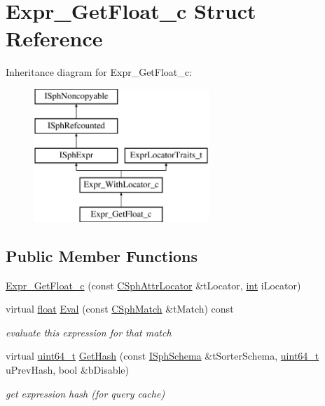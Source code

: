 \hypertarget{structExpr__GetFloat__c}{\section{Expr\-\_\-\-Get\-Float\-\_\-c Struct Reference}
\label{structExpr__GetFloat__c}
}
Inheritance diagram for Expr\-\_\-\-Get\-Float\-\_\-c\-:\begin{figure}[H]
\begin{center}
\leavevmode
\includegraphics[height=5.000000cm]{structExpr__GetFloat__c}
\end{center}
\end{figure}
\subsection*{Public Member Functions}
\begin{DoxyCompactItemize}
\item 
\hyperlink{structExpr__GetFloat__c_a2bade51cf3b9e873dc2a28bccbd918f9}{Expr\-\_\-\-Get\-Float\-\_\-c} (const \hyperlink{structCSphAttrLocator}{C\-Sph\-Attr\-Locator} \&t\-Locator, \hyperlink{sphinxexpr_8cpp_a4a26e8f9cb8b736e0c4cbf4d16de985e}{int} i\-Locator)
\item 
virtual \hyperlink{sphinxexpr_8cpp_a0e0d0739f7035f18f949c2db2c6759ec}{float} \hyperlink{structExpr__GetFloat__c_ad903e9b4bef2fff20ffe7f9d1ff599ec}{Eval} (const \hyperlink{classCSphMatch}{C\-Sph\-Match} \&t\-Match) const 
\begin{DoxyCompactList}\small\item\em evaluate this expression for that match \end{DoxyCompactList}\item 
virtual \hyperlink{sphinxstd_8h_aaa5d1cd013383c889537491c3cfd9aad}{uint64\-\_\-t} \hyperlink{structExpr__GetFloat__c_a6c4f4c4d6eb89169ebe12b9d4d270af7}{Get\-Hash} (const \hyperlink{classISphSchema}{I\-Sph\-Schema} \&t\-Sorter\-Schema, \hyperlink{sphinxstd_8h_aaa5d1cd013383c889537491c3cfd9aad}{uint64\-\_\-t} u\-Prev\-Hash, bool \&b\-Disable)
\begin{DoxyCompactList}\small\item\em get expression hash (for query cache) \end{DoxyCompactList}\end{DoxyCompactItemize}
